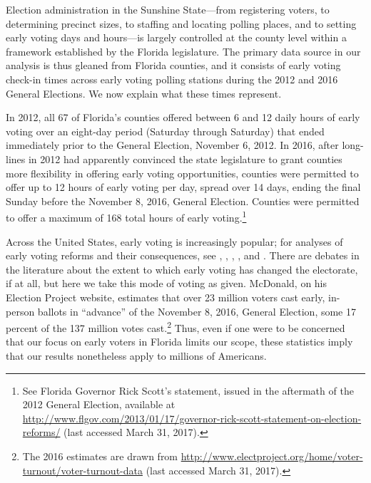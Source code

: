 \documentclass[12pt,titlepage]{article}
\begin{document}
Election administration in the Sunshine State---from registering
voters, to determining precinct sizes, to staffing and locating
polling places, and to setting early voting days and hours---is
largely controlled at the county level within a framework established
by the Florida legislature. The primary data source in our analysis is
thus gleaned from Florida counties, and it consists of early voting
check-in times across early voting polling stations during the 2012
and 2016 General Elections.  We now explain what these times
represent.

In 2012, all 67 of Florida's counties offered between 6 and 12 daily
hours of early voting over an eight-day period (Saturday through
Saturday) that ended immediately prior to the General Election,
November 6, 2012.  In 2016, after long-lines in 2012 had apparently
convinced the state legislature to grant counties more flexibility in
offering early voting opportunities, counties were permitted to offer
up to 12 hours of early voting per day, spread over 14 days, ending
the final Sunday before the November 8, 2016, General Election.
Counties were permitted to offer a maximum of 168 total hours of early
voting.\footnote{See Florida Governor Rick Scott's statement, issued
  in the aftermath of the 2012 General Election, available at
  \url{http://www.flgov.com/2013/01/17/governor-rick-scott-statement-on-election-reforms/}
  (last accessed March 31, 2017).}

Across the United States, early voting is increasingly popular; for
analyses of early voting reforms and their consequences, see
\citet{neelyrichardson:earlyvoting},
\citet{gronke:earlyvotingreforms}, \citet{gronketoffey:psychological},
\citet{gronkebaum:growth}, and \citet{burdenetal:unanticipated}.
There are debates in the literature about the extent to which early
voting has changed the electorate, if at all, but here we take this
mode of voting as given.  McDonald, on his Election Project website,
estimates that over 23 million voters cast early, in-person ballots in
``advance'' of the November 8, 2016, General Election, some 17 percent
of the 137 million votes cast.\footnote{The 2016 estimates are drawn
  from
  \url{http://www.electproject.org/home/voter-turnout/voter-turnout-data}
  (last accessed March 31, 2017).}  Thus, even if one were to be
concerned that our focus on early voters in Florida limits our scope,
these statistics imply that our results nonetheless apply to millions
of Americans.
\end{document}
